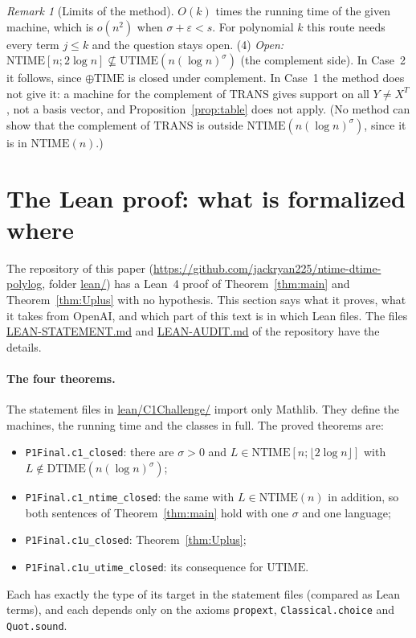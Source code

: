 \documentclass[11pt]{article}
\theoremstyle{definition}
\theoremstyle{remark}
\newtheorem{remark}[theorem]{Remark}
\newcommand{\DTIME}{\mathrm{DTIME}}
\newcommand{\NTIME}{\mathrm{NTIME}}
\newcommand{\parTIME}{\oplus\mathrm{TIME}}
\newcommand{\TRANS}{\mathrm{TRANS}}
\newcommand{\src}[1]{\url{#1}}
\begin{document}
\begin{remark}[Limits of the method]
$O(k)$ times the running time of the given machine, which is $o(n^2)$ when $\sigma+\varepsilon<s$. For polynomial $k$ this route needs every term $j\le k$ and the question stays open.
(4) \emph{Open:} $\NTIME[n;2\log n]\not\subseteq\mathrm{UTIME}(n(\log n)^{\sigma})$ (the complement side). In Case~2 it follows,
since $\parTIME$ is closed under complement. In Case~1 the method does not give it: a machine for the complement of $\TRANS$ gives
support on all $Y\ne X^T$, not a basis vector, and Proposition~\ref{prop:table} does not apply. (No method can show that the
complement of $\TRANS$ is outside $\NTIME(n(\log n)^{\sigma})$, since it is in $\NTIME(n)$.)
\end{remark}

\section{The Lean proof: what is formalized where}\label{sec:lean}

The repository of this paper (\url{https://github.com/jackryan225/ntime-dtime-polylog}, folder \src{lean/}) has a Lean~4 proof of
Theorem~\ref{thm:main} and Theorem~\ref{thm:Uplus} with no hypothesis. This section says what it proves, what it takes from
OpenAI, and which part of this text is in which Lean files. The files \src{LEAN-STATEMENT.md} and \src{LEAN-AUDIT.md} of the
repository have the details.

\paragraph{The four theorems.} The statement files in \src{lean/C1Challenge/} import only Mathlib. They define the machines, the
running time and the classes in full. The proved theorems are:
\begin{itemize}
\item \texttt{P1Final.c1\_closed}: there are $\sigma>0$ and $L\in\NTIME[n;\lfloor2\log n\rfloor]$ with $L\notin\DTIME(n(\log n)^{\sigma})$;
\item \texttt{P1Final.c1\_ntime\_closed}: the same with $L\in\NTIME(n)$ in addition, so both sentences of Theorem~\ref{thm:main}
  hold with one $\sigma$ and one language;
\item \texttt{P1Final.c1u\_closed}: Theorem~\ref{thm:Uplus};
\item \texttt{P1Final.c1u\_utime\_closed}: its consequence for $\mathrm{UTIME}$.
\end{itemize}
Each has exactly the type of its target in the statement files (compared as Lean terms), and each depends only on the axioms
\texttt{propext}, \texttt{Classical.choice} and \texttt{Quot.sound}.
\end{document}
